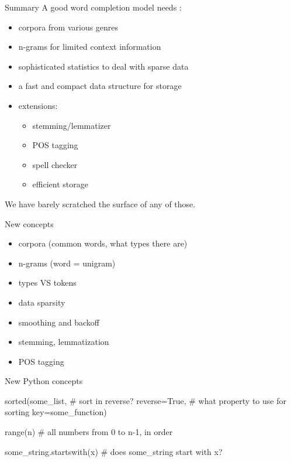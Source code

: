 \documentclass[professionalfonts, xcolor={usenames,svgnames,x11names,table}]{beamer}
\begin{document}
\begin{frame}{Summary}
    A good word completion model needs :

    \begin{itemize}
        \item corpora from various genres
        \item n-grams for limited context information
        \item sophisticated statistics to deal with sparse data
        \item a fast and compact data structure for storage
        \item extensions:
            \begin{itemize}
                \item stemming\slash lemmatizer
                \item POS tagging
                \item spell checker
                \item efficient storage
            \end{itemize}
    \end{itemize}

    We have barely scratched the surface of any of those.
\end{frame}

\begin{frame}[fragile]{New concepts}
    \begin{itemize}
        \item corpora (common words, what types there are)
        \item n-grams (word = unigram)
        \item types VS tokens
        \item data sparsity
        \item smoothing and backoff
        \item stemming, lemmatization
        \item POS tagging
    \end{itemize}
\end{frame}

\begin{frame}[fragile]{New Python concepts}
    \begin{pythoncode}
        sorted(some_list,
               # sort in reverse?
               reverse=True, 
               # what property to use for sorting
               key=some_function)

        range(n)  # all numbers from 0 to n-1, in order

        some_string.startswith(x)  # does some_string start with x?
    \end{pythoncode}
\end{frame}
\end{document}
